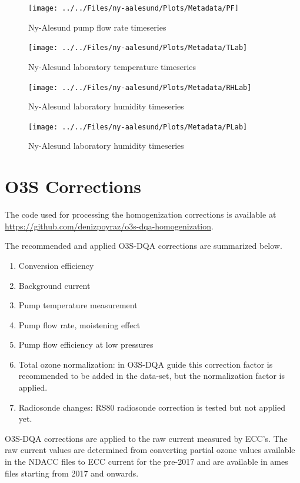 \documentclass{article}
\begin{document}
\begin{figure}
\centering
\texttt{[image: ../../Files/ny-aalesund/Plots/Metadata/PF]}
\caption{Ny-Alesund pump flow rate timeseries}
\label{fig:PF}
\end{figure}



\begin{figure}
\centering
\texttt{[image: ../../Files/ny-aalesund/Plots/Metadata/TLab]}
\caption{Ny-Alesund laboratory temperature timeseries}
\label{fig:TLab}
\end{figure}

\begin{figure}
\centering
\texttt{[image: ../../Files/ny-aalesund/Plots/Metadata/RHLab]}
\caption{Ny-Alesund laboratory humidity timeseries}
\label{fig:ULab}
\end{figure}

\begin{figure}
\centering
\texttt{[image: ../../Files/ny-aalesund/Plots/Metadata/PLab]}
\caption{Ny-Alesund laboratory humidity timeseries}
\label{fig:PLab}
\end{figure}

\section{O3S Corrections}
The code used for processing the homogenization corrections is available at \url{https://github.com/denizpoyraz/o3s-dqa-homogenization}.
\label{sec:v04}


The recommended and applied O3S-DQA corrections are summarized below.
\begin{enumerate}
\item Conversion efficiency
\item Background current
\item Pump temperature measurement
\item Pump flow rate, moistening effect
\item Pump flow efficiency at low pressures
\item Total ozone normalization: in O3S-DQA guide this correction factor is recommended to be added in the data-set,
but the normalization factor is applied.
\item Radiosonde changes: RS80 radiosonde correction is tested but not applied yet.
\end{enumerate}


O3S-DQA corrections are applied to the raw current measured by ECC's. The raw current values are
determined from converting partial ozone values available
in the NDACC files to ECC current for the pre-2017 and are available in ames files starting from 2017
and onwards.
\end{document}
